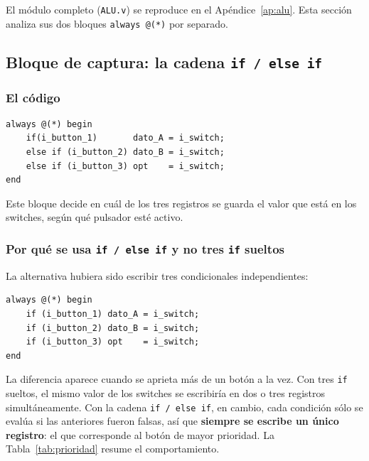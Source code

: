 \documentclass[12pt,a4paper]{article}
\begin{document}
El módulo completo (\texttt{ALU.v}) se reproduce en el
Apéndice~\ref{ap:alu}. Esta sección analiza sus dos bloques
\texttt{always @(*)} por separado.

\subsection{Bloque de captura: la cadena \texttt{if / else if}}
\label{sec:ifelse}

\subsubsection{El código}

\begin{lstlisting}[caption={Bloque de captura de datos con prioridad.},label={lst:captura}]
always @(*) begin
    if(i_button_1)       dato_A = i_switch;
    else if (i_button_2) dato_B = i_switch;
    else if (i_button_3) opt    = i_switch;
end
\end{lstlisting}

Este bloque decide en cuál de los tres registros se guarda el valor que está en
los switches, según qué pulsador esté activo.

\subsubsection{Por qué se usa \texttt{if / else if} y no tres \texttt{if} sueltos}

La alternativa hubiera sido escribir tres condicionales independientes:

\begin{lstlisting}[caption={Alternativa sin prioridad (descartada).},label={lst:noprio}]
always @(*) begin
    if (i_button_1) dato_A = i_switch;
    if (i_button_2) dato_B = i_switch;
    if (i_button_3) opt    = i_switch;
end
\end{lstlisting}

La diferencia aparece cuando se aprieta más de un botón a la vez. Con tres
\texttt{if} sueltos, el mismo valor de los switches se escribiría en dos o tres
registros simultáneamente. Con la cadena \texttt{if / else if}, en cambio, cada
condición sólo se evalúa si las anteriores fueron falsas, así que
\textbf{siempre se escribe un único registro}: el que corresponde al botón de
mayor prioridad. La Tabla~\ref{tab:prioridad} resume el comportamiento.
\end{document}
